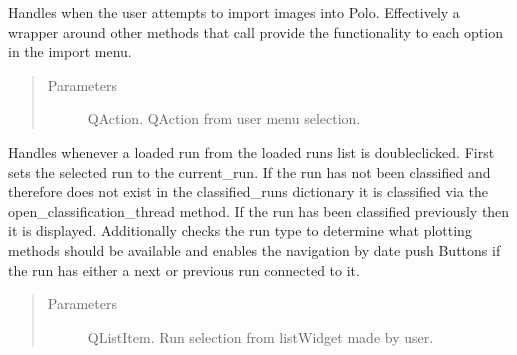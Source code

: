 \documentclass[letterpaper,10pt,english]{sphinxmanual}
\begin{document}
\begin{fulllineitems}
\begin{fulllineitems}
\label{\detokenize{polo.windows:polo.windows.main_window.MainWindow.handle_image_import}}
Handles when the user attempts to import images into Polo. Effectively
a wrapper around other methods that call provide the functionality to
each option in the import menu.
\begin{quote}\begin{description}
\item[{Parameters}] \leavevmode
{} \textendash{} QAction. QAction from user menu selection.

\end{description}\end{quote}

\end{fulllineitems}


\begin{fulllineitems}
\label{\detokenize{polo.windows:polo.windows.main_window.MainWindow.handle_opening_run}}
Handles whenever a loaded run from the loaded runs list is
doubleclicked. First sets the selected run to the current\_run. If the
run has not been classified and therefore does not exist in the
classified\_runs dictionary it is classified via the
open\_classification\_thread method. If the run has been classified previously
then it is displayed. Additionally checks the run type to determine what
plotting methods should be available and enables the navigation by date
push Buttons if the run has either a next or previous run
connected to it.
\begin{quote}\begin{description}
\item[{Parameters}] \leavevmode
{} \textendash{} QListItem. Run selection from listWidget made by user.

\end{description}\end{quote}

\end{fulllineitems}


\end{fulllineitems}
\end{document}
